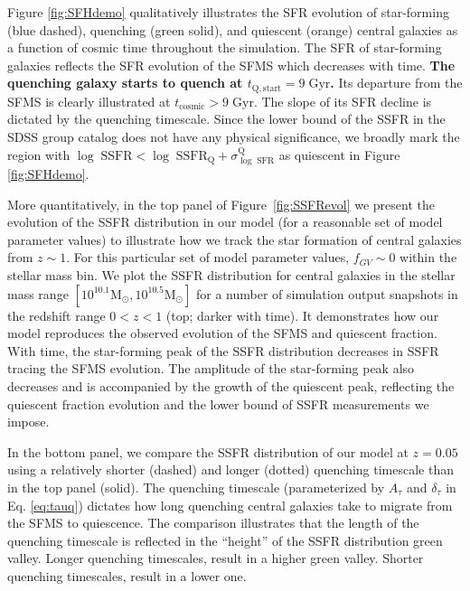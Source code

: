 \documentclass[iop,apj,tighten,twocolappendix,numberedappendix]{emulateapj}
\begin{document}
Figure \ref{fig:SFHdemo} qualitatively illustrates the SFR evolution of 
star-forming (blue dashed), quenching (green solid), and quiescent (orange) 
central galaxies as a function of cosmic time throughout the simulation. 
The SFR of star-forming galaxies reflects the SFR evolution of the SFMS 
which decreases with time. {\color{red} \bf The quenching galaxy starts to quench
at $t_\mathrm{Q, start} = 9\;\mathrm{Gyr}$.} Its departure from the SFMS 
is clearly illustrated at $t_\mathrm{cosmic} > 9\;\mathrm{Gyr}$. The slope
of its SFR decline is dictated by the quenching timescale. Since the 
lower bound of the SSFR in the SDSS group catalog does not have any 
physical significance, we broadly mark the region with 
$\log\;\mathrm{SSFR} < \log\;\mathrm{SSFR}_\mathrm{Q} + 
\sigma^\mathrm{Q}_{\log\;\mathrm{SFR}}$ as quiescent in Figure \ref{fig:SFHdemo}. 

More quantitatively, in the top panel of Figure~\ref{fig:SSFRevol} 
we present the evolution of the SSFR distribution in our model 
(for a reasonable set of model parameter values) to illustrate how 
we track the star formation of central galaxies from $z \sim 1$. 
For this particular set of model parameter values, $f_{GV} \sim 0$ 
within the stellar mass bin.
We plot the SSFR distribution for central galaxies in the stellar 
mass range $[10^{10.1}\mathrm{M}_\odot, 10^{10.5}\mathrm{M}_\odot]$ 
for a number of simulation output snapshots in the redshift range 
$0 < z < 1$ (top; darker with time). 
It demonstrates how our model reproduces the observed evolution 
of the SFMS and quiescent fraction.
With time, the star-forming peak of the SSFR distribution 
decreases in SSFR tracing the SFMS evolution. The amplitude of 
the star-forming peak also decreases and is accompanied by the 
growth of the quiescent peak, reflecting the quiescent 
fraction evolution and the lower bound of SSFR measurements we impose.

In the bottom panel, we compare the SSFR distribution of our model
at $z = 0.05$ using a relatively shorter (dashed) and longer (dotted)
quenching timescale than in the top panel (solid). The quenching
timescale (parameterized by $A_\tau$ and $\delta_\tau$ in 
Eq. \ref{eq:tauq}) dictates how long quenching central galaxies
take to migrate from the SFMS to quiescence. The comparison illustrates 
that the length of the quenching timescale is reflected in the 
``height'' of the SSFR distribution green valley. Longer quenching 
timescales, result in a higher green valley. Shorter quenching timescales, 
result in a lower one.
\end{document}
